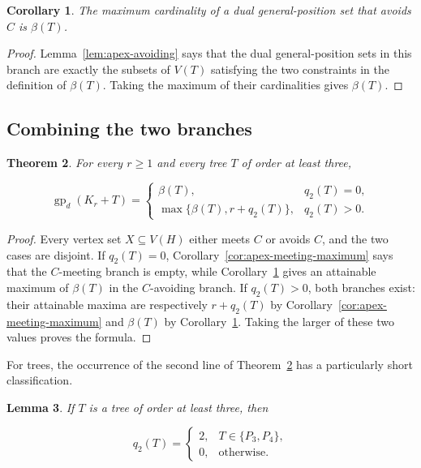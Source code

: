 \documentclass[11pt,a4paper]{article}
\newtheorem{theorem}{Theorem}[section]
\newtheorem{lemma}[theorem]{Lemma}
\newtheorem{corollary}[theorem]{Corollary}
\numberwithin{equation}{section}
\begin{document}
\begin{corollary}\label{cor:apex-avoiding-maximum}
The maximum cardinality of a dual
general-position set that avoids \(C\) is \(\beta(T)\).
\end{corollary}

\begin{proof}
Lemma~\ref{lem:apex-avoiding} says that the dual general-position sets in
this branch are exactly the subsets of \(V(T)\) satisfying the two
constraints in the definition of \(\beta(T)\). Taking the maximum of
their cardinalities gives \(\beta(T)\).
\end{proof}

\subsection{Combining the two branches}\label{sec:combining}

\begin{theorem}\label{thm:two-branch}
For every \(r\ge 1\) and every tree \(T\) of order
at least three,

\[
\operatorname{gp}_d(K_r+T)=
\begin{cases}
\beta(T),&q_2(T)=0,\\
\max\{\beta(T),r+q_2(T)\},&q_2(T)>0.
\end{cases}
\]
\end{theorem}

\begin{proof}
Every vertex set \(X\subseteq V(H)\) either meets \(C\)
or avoids \(C\), and the two cases are disjoint. If \(q_2(T)=0\),
Corollary~\ref{cor:apex-meeting-maximum} says that the \(C\)-meeting branch is empty, while
Corollary~\ref{cor:apex-avoiding-maximum} gives an attainable maximum of \(\beta(T)\) in the
\(C\)-avoiding branch. If \(q_2(T)>0\), both branches exist: their
attainable maxima are respectively \(r+q_2(T)\) by Corollary~\ref{cor:apex-meeting-maximum} and
\(\beta(T)\) by Corollary~\ref{cor:apex-avoiding-maximum}. Taking the larger of these two values
proves the formula.
\end{proof}

For trees, the occurrence of the second line of Theorem~\ref{thm:two-branch} has a
particularly short classification.

\begin{lemma}\label{lem:q2-trees}
If \(T\) is a tree of order at least three, then

\[
q_2(T)=
\begin{cases}
2,&T\in\{P_3,P_4\},\\
0,&\text{otherwise}.
\end{cases}
\]
\end{lemma}
\end{document}
